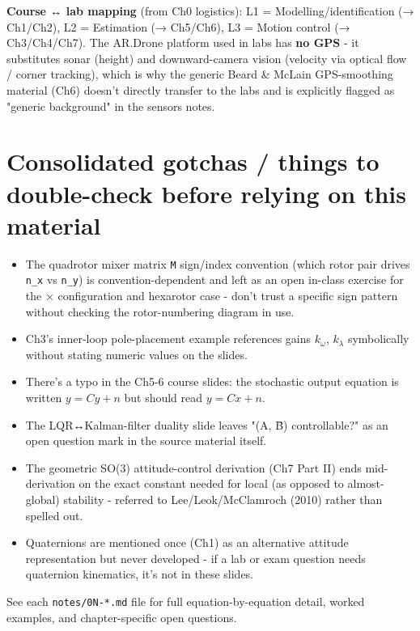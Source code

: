 \documentclass[11pt]{article}
\begin{document}
\textbf{Course ↔ lab mapping} (from Ch0 logistics): L1 = Modelling/identification (→ Ch1/Ch2), L2 = Estimation (→ Ch5/Ch6), L3 = Motion control (→ Ch3/Ch4/Ch7). The AR.Drone platform used in labs has \textbf{no GPS} - it substitutes sonar (height) and downward-camera vision (velocity via optical flow / corner tracking), which is why the generic Beard \& McLain GPS-smoothing material (Ch6) doesn't directly transfer to the labs and is explicitly flagged as "generic background" in the sensors notes.

\section{Consolidated gotchas / things to double-check before relying on this material}

\begin{itemize}
\item The quadrotor mixer matrix \texttt{M} sign/index convention (which rotor pair drives \texttt{n\_\allowbreak{}x} vs \texttt{n\_\allowbreak{}y}) is convention-dependent and left as an open in-class exercise for the × configuration and hexarotor case - don't trust a specific sign pattern without checking the rotor-numbering diagram in use.
\item Ch3's inner-loop pole-placement example references gains $k_ω$, $k_λ$ symbolically without stating numeric values on the slides.
\item There's a typo in the Ch5-6 course slides: the stochastic output equation is written $y = Cy + n$ but should read $y = Cx + n$.
\item The LQR↔Kalman-filter duality slide leaves "(A, B̄) controllable?" as an open question mark in the source material itself.
\item The geometric SO(3) attitude-control derivation (Ch7 Part II) ends mid-derivation on the exact constant needed for local (as opposed to almost-global) stability - referred to Lee/Leok/McClamroch (2010) rather than spelled out.
\item Quaternions are mentioned once (Ch1) as an alternative attitude representation but never developed - if a lab or exam question needs quaternion kinematics, it's not in these slides.
\end{itemize}

See each \texttt{notes/0N-*.md} file for full equation-by-equation detail, worked examples, and chapter-specific open questions.
\end{document}
